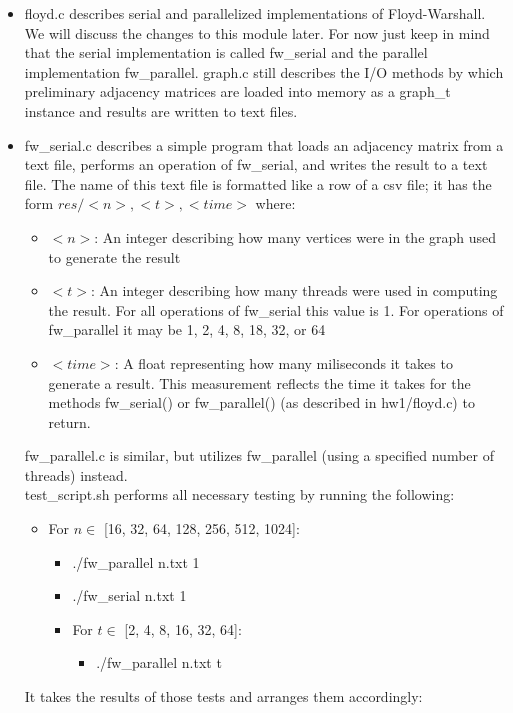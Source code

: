 \documentclass[]{article}
\begin{document}
\begin{itemize}
		\item floyd.c describes serial and parallelized implementations of Floyd-Warshall. We will discuss the changes to this module later. For now just keep in mind that the serial implementation is called fw\_serial and the parallel implementation fw\_parallel. graph.c still describes the I/O methods by which preliminary adjacency matrices are loaded into memory as a graph\_t instance and results are written to text files.
		\item fw\_serial.c describes a simple program that loads an adjacency matrix from a text file, performs an operation of fw\_serial, and writes the result to a text file. The name of this text file is formatted like a row of a csv file; it has the form $res/<n>,<t>,<time>$ where:
		\begin{itemize}
			\item $<n>$: An integer describing how many vertices were in the graph used to generate the result
			\item $<t>$: An integer describing how many threads were used in computing the result. For all operations of fw\_serial this value is 1. For operations of fw\_parallel it may be 1, 2, 4, 8, 18, 32, or 64
			\item $<time>$: A float representing how many miliseconds it takes to generate a result. This measurement reflects the time it takes for the methods fw\_serial() or fw\_parallel() (as described in hw1/floyd.c) to return.
		\end{itemize}	
		fw\_parallel.c is similar, but utilizes fw\_parallel (using a specified number of threads) instead. 
		\\
		test\_script.sh performs all necessary testing by running the following:
		\begin{itemize}
			\item For $n \in$ [16, 32, 64, 128, 256, 512, 1024]:
			\begin{itemize}
				\item ./fw\_parallel n.txt 1
				\item ./fw\_serial n.txt 1
				\item For $t \in$ [2, 4, 8, 16, 32, 64]:
				\begin{itemize}
					\item ./fw\_parallel n.txt t
				\end{itemize}
			\end{itemize}
		\end{itemize}
		It takes the results of those tests and arranges them accordingly:
		\begin{itemize}

\end{itemize}
\end{itemize}
\end{document}
